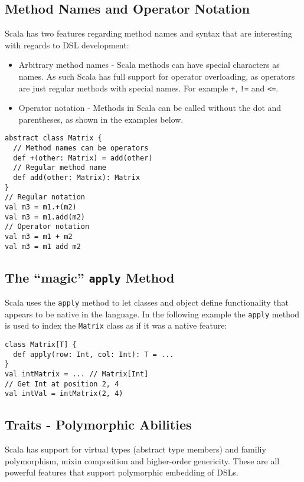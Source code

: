 \documentclass[a4paper,english]{report}
\begin{document}
\subsection{Method Names and Operator Notation}

Scala has two features regarding method names and syntax that are
interesting with regards to DSL development:

\begin{itemize}
\item Arbitrary method names - Scala methods can have special
  characters as names. As such Scala has full support for operator
  overloading, as operators are just regular methods with special
  names. For example \texttt{+}, \texttt{!=} and \texttt{<=}.
\item Operator notation - Methods in Scala can be called without the
  dot and parentheses, as shown in the examples below.
\end{itemize}

\begin{lstlisting}
abstract class Matrix {
  // Method names can be operators
  def +(other: Matrix) = add(other)
  // Regular method name
  def add(other: Matrix): Matrix
}
// Regular notation
val m3 = m1.+(m2)
val m3 = m1.add(m2)
// Operator notation
val m3 = m1 + m2
val m3 = m1 add m2
\end{lstlisting}

\subsection{The ``magic'' \texttt{apply} Method}

Scala uses the \texttt{apply} method to let classes and object define
functionality that appears to be native in the language. In the
following example the \texttt{apply} method is used to index the
\texttt{Matrix} class as if it was a native feature:

\begin{lstlisting}
class Matrix[T] {
  def apply(row: Int, col: Int): T = ...
}
val intMatrix = ... // Matrix[Int]
// Get Int at position 2, 4
val intVal = intMatrix(2, 4)
\end{lstlisting}

\subsection{Traits - Polymorphic Abilities}

Scala has support for virtual types (abstract type members) and
familiy polymorphism\cite{ode03}, mixin composition\cite{ode05} and
higher-order genericity\cite{moo08}. These are all powerful features
that support polymorphic embedding of DSLs\cite{hof08}.
\end{document}

